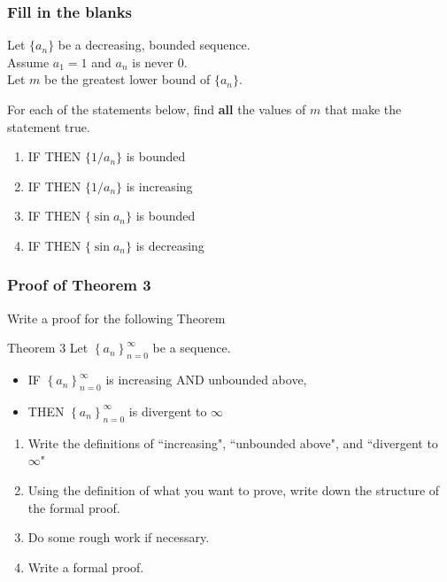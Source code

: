 \documentclass[14pt]{beamer}
\newcommand {\DS} [1] {${\displaystyle #1}$}
\newcommand{\p}{\pause}
\newcommand{\setsize}[1]{\fontsize{#1}{#1}\selectfont} %
\newcommand{\smallerfont}{\setsize{13}} %
\newcommand{\an}{\left\{ a_n \right\}_{n=0}^{\infty}}
\begin{document}
\begin{frame}[t]
\smallerfont
\frametitle{Fill in the blanks}

Let \DS{\{a_n\}} be a decreasing, bounded sequence.   \\
Assume $a_1 = 1$ and $a_n$ is never $0$. \\
Let $m$ be the greatest lower bound of \DS{\{a_n\}}.\\
\medskip

For each of the statements below, find \textbf{all} the values of $m$ that make the statement true.

\begin{enumerate}
	\item  IF \boxed{\phantom{????????????}} THEN \DS{\{1/a_n\}} is bounded
	\item  IF \boxed{\phantom{????????????}} THEN \DS{\{1/a_n\}} is increasing
	\item  IF \boxed{\phantom{????????????}} THEN \DS{\{\sin a_n\}} is bounded
	\item  IF \boxed{\phantom{????????????}} THEN \DS{\{\sin a_n\}} is decreasing
\end{enumerate}

\end{frame}
\begin{frame}[t]
\smallerfont
\frametitle{Proof of Theorem 3}
 Write a proof for the following Theorem
\begin{block}{\smallerfont Theorem 3}
Let \DS{\an} be a sequence.
	\begin{itemize}
		\item IF \DS{\an} is increasing AND unbounded above,
		\item THEN \DS{\an} is divergent to $\infty$ 
	\end{itemize}
\end{block}
\p
\begin{enumerate}
	\item  Write the definitions of ``increasing", ``unbounded above", and ``divergent to $\infty$"
	\item  Using the definition of what you want to prove, write down the structure of the formal proof.
	\item  Do some rough work if necessary.
	\item  Write a formal proof.
\end{enumerate}

\end{frame}
\end{document}
